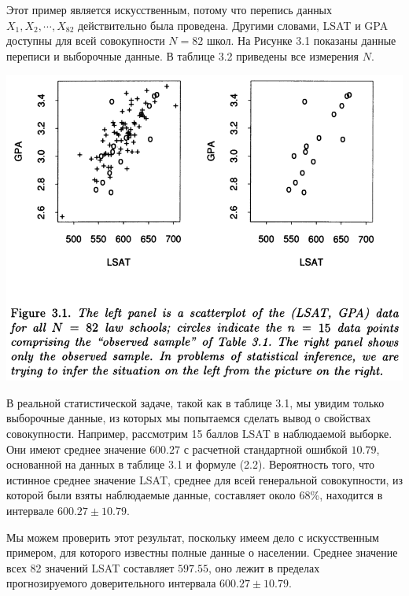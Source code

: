 Этот пример является искусственным, потому что перепись данных $X_1, X_2,\cdots, X_82$ действительно была проведена. Другими словами, LSAT и GPA доступны для всей совокупности $N = 82$ школ. На Рисунке 3.1 показаны данные переписи и выборочные данные. В таблице 3.2 приведены все измерения $N$. 
\newline

\noindent
\includegraphics[width=\linewidth]{2/f31.png}
\newline

В реальной статистической задаче, такой как в таблице 3.1, мы увидим только выборочные данные, из которых мы попытаемся сделать вывод о свойствах совокупности. Например, рассмотрим 15 баллов LSAT в наблюдаемой выборке. Они имеют среднее значение $600.27$ с расчетной стандартной ошибкой $10.79$, основанной на данных в таблице 3.1 и формуле (2.2). Вероятность того, что истинное среднее значение LSAT, среднее для всей генеральной совокупности, из которой были взяты наблюдаемые данные, составляет около 68\%, находится в интервале $600.27 \pm 10.79$. 

Мы можем проверить этот результат, поскольку имеем дело с искусственным примером, для которого известны полные данные о населении. Среднее значение всех 82 значений LSAT составляет $597.55$, оно лежит в пределах прогнозируемого доверительного интервала $600.27 \pm 10.79$. 
\newline

